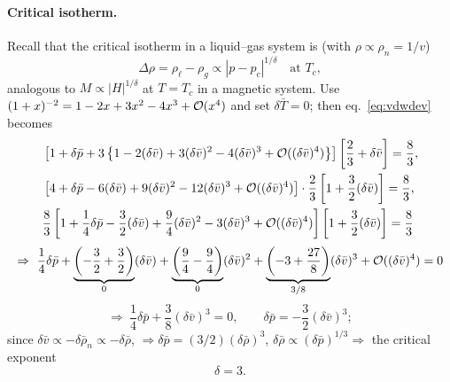 \paragraph{Critical isotherm.} Recall that the critical isotherm in a liquid--gas system is (with
$\rho\propto\rho_n = 1/v$)
\begin{equation}
  \Delta\rho = \rho_\ell-\rho_g\propto|p-p_c|^{1/\delta}\quad\text{at } T_c,
\end{equation}
analogous to $M\propto|H|^{1/\delta}$ at $T = T_c$ in a magnetic system. Use
$(1+x)^{-2} = 1-2x+3x^2-4x^3+\mathcal{O}(x^4)$ and set $\delta\bar T = 0$; then eq.~\eqref{eq:vdwdev} becomes
\begin{align}
  &\left[1+\delta\bar p+3\left\{1-2(\delta\bar v)+3(\delta\bar v)^2-4(\delta\bar v)^3+\mathcal{O}((\delta\bar v)^4)\right\}\right]
   \left[\frac{2}{3}+\delta\bar v\right] = \frac{8}{3},\nonumber\\
  &\left[4+\delta\bar p-6(\delta\bar v)+9(\delta\bar v)^2-12(\delta\bar v)^3+\mathcal{O}((\delta\bar v)^4)\right]\cdot\frac{2}{3}\left[1+\frac{3}{2}(\delta\bar v)\right] = \frac{8}{3},\nonumber\\
  &\frac{8}{3}\left[1+\frac{1}{4}\delta\bar p-\frac{3}{2}(\delta\bar v)+\frac{9}{4}(\delta\bar v)^2-3(\delta\bar v)^3+\mathcal{O}((\delta\bar v)^4)\right]\left[1+\frac{3}{2}(\delta\bar v)\right] = \frac{8}{3}
\end{align}
\begin{equation}
  \Rightarrow\ \frac{1}{4}\delta\bar p + \underbrace{\left(-\frac{3}{2}+\frac{3}{2}\right)}_{0}(\delta\bar v)
  + \underbrace{\left(\frac{9}{4}-\frac{9}{4}\right)}_{0}(\delta\bar v)^2
  + \underbrace{\left(-3+\frac{27}{8}\right)}_{3/8}(\delta\bar v)^3 + \Order((\delta\bar v)^4) = 0
\end{equation}
\begin{equation}
  \Rightarrow\ \frac{1}{4}\delta\bar p + \frac{3}{8}(\delta\bar v)^3 = 0,\qquad \delta\bar p = -\frac{3}{2}(\delta\bar v)^3;
\end{equation}
since $\delta\bar v\propto-\delta\bar\rho_n\propto-\delta\bar\rho$, $\Rightarrow\delta\bar p = (3/2)(\delta\bar\rho)^3$,
$\delta\bar\rho\propto(\delta\bar p)^{1/3}\Rightarrow$ the critical exponent
\begin{equation}
  \boxed{\delta = 3}.
\end{equation}

